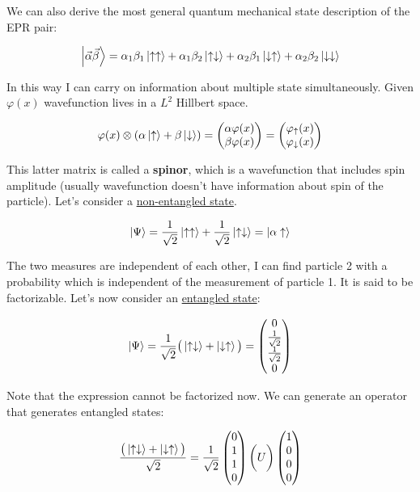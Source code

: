 	We can also derive the most general quantum mechanical state description of the EPR pair:

	$$\ket{\vec{\alpha}\vec{\beta}}=\alpha_1\beta_1\ket{\uparrow\uparrow}+\alpha_1\beta_2\ket{\uparrow\downarrow}+\alpha_2\beta_1\ket{\downarrow\uparrow}+\alpha_2\beta_2\ket{\downarrow\downarrow}$$

	In this way I can carry on information about multiple state simultaneously.
	\newline
	Given $\varphi(x)$ wavefunction lives in a \emph{$L^2$} Hillbert space.

	$$\varphi(x)\otimes(\alpha\ket{\uparrow}+\beta\ket{\downarrow})=\begin{pmatrix}\alpha\varphi(x)\\\beta\varphi(x)\end{pmatrix}=\begin{pmatrix}\varphi_{\uparrow}(x)\\\varphi_{\downarrow}(x)\end{pmatrix}$$

	This latter matrix is called a \textbf{spinor}, which is a wavefunction that includes spin amplitude (usually wavefunction doesn't have information about spin of the particle).
	Let's consider a \underline{non-entangled state}.

	$$\ket{\Psi}=\frac{1}{\sqrt{2}}\ket{\uparrow\uparrow}+\frac{1}{\sqrt{2}}\ket{\uparrow\downarrow}=\ket{\alpha\uparrow}$$

	The two measures are independent of each other, I can find particle 2 with a probability which is independent of the measurement of particle 1.
It is said to be factorizable.
	Let's now consider an \underline{entangled state}:

	$$\ket{\Psi}=\frac{1}{\sqrt{2}}\big(\ket{\uparrow\downarrow}+\ket{\downarrow\uparrow}\big) = \begin{pmatrix}0\\\frac{1}{\sqrt{2}}\\\frac{1}{\sqrt{2}}\\0\end{pmatrix}$$

	Note that the expression cannot be factorized now.
We can generate an operator that generates entangled states:

	$$\frac{\big(\ket{\uparrow\downarrow}+\ket{\downarrow\uparrow}\big)}{\sqrt{2}}=\frac{1}{\sqrt{2}}\begin{pmatrix}0\\1\\1\\0\end{pmatrix}\bigg(U\bigg)\begin{pmatrix}1\\0\\0\\0\end{pmatrix}$$

